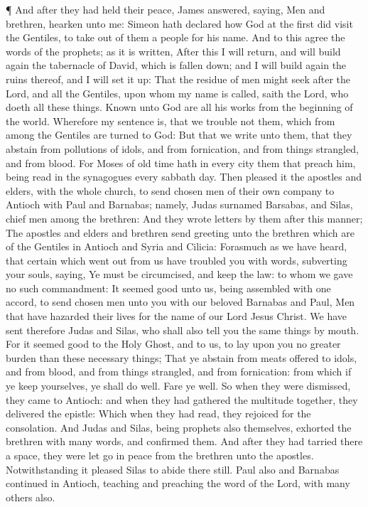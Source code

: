  ¶ And after they had held their peace, James answered,
saying, Men and brethren, hearken unto me:  Simeon hath
declared how God at the first did visit the Gentiles, to take out of
them a people for his name.  And to this agree the words of
the prophets; as it is written,  After this I will return,
and will build again the tabernacle of David, which is fallen down; and
I will build again the ruins thereof, and I will set it up:
 That the residue of men might seek after the Lord, and all
the Gentiles, upon whom my name is called, saith the Lord, who doeth all
these things.  Known unto God are all his works from the
beginning of the world.  Wherefore my sentence is, that we
trouble not them, which from among the Gentiles are turned to God:
 But that we write unto them, that they abstain from
pollutions of idols, and from fornication, and from things strangled,
and from blood.  For Moses of old time hath in every city
them that preach him, being read in the synagogues every sabbath day.
 Then pleased it the apostles and elders, with the whole
church, to send chosen men of their own company to Antioch with Paul and
Barnabas; namely, Judas surnamed Barsabas, and Silas, chief men among
the brethren:  And they wrote letters by them after this
manner; The apostles and elders and brethren send greeting unto the
brethren which are of the Gentiles in Antioch and Syria and Cilicia:
 Forasmuch as we have heard, that certain which went out
from us have troubled you with words, subverting your souls, saying, Ye
must be circumcised, and keep the law: to whom we gave no such
commandment:  It seemed good unto us, being assembled with
one accord, to send chosen men unto you with our beloved Barnabas and
Paul,  Men that have hazarded their lives for the name of
our Lord Jesus Christ.  We have sent therefore Judas and
Silas, who shall also tell you the same things by mouth. 
For it seemed good to the Holy Ghost, and to us, to lay upon you no
greater burden than these necessary things;  That ye
abstain from meats offered to idols, and from blood, and from things
strangled, and from fornication: from which if ye keep yourselves, ye
shall do well. Fare ye well.  So when they were dismissed,
they came to Antioch: and when they had gathered the multitude together,
they delivered the epistle:  Which when they had read, they
rejoiced for the consolation.  And Judas and Silas, being
prophets also themselves, exhorted the brethren with many words, and
confirmed them.  And after they had tarried there a space,
they were let go in peace from the brethren unto the apostles.
 Notwithstanding it pleased Silas to abide there still.
 Paul also and Barnabas continued in Antioch, teaching and
preaching the word of the Lord, with many others also.

